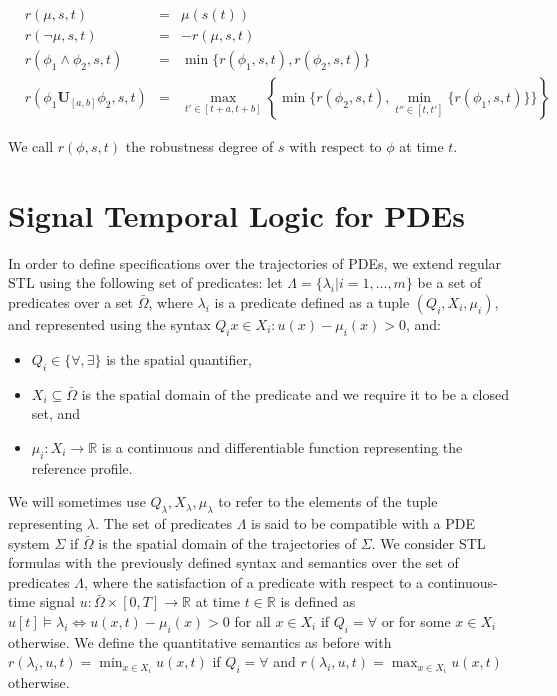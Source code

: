 \documentclass[oribibl]{llncs/llncs}
\newcommand*{\R}{\mathbb{R}}
\newcommand{\luntil}{\mathbf{U}}
\begin{document}
\begin{equation}
    \begin{aligned}
        &r(\mu, s, t) &= &\mu(s(t)) \\
        &r(\lnot \mu, s, t) &= &-r(\mu, s,t) \\
        &r(\phi_1 \land \phi_2, s, t) &= &\min\{r(\phi_1,s, t),
    r(\phi_2,s, t)\} \\
    &r(\phi_1 \luntil_{[a,b]} \phi_2,s, t) &= 
    &\max_{t' \in [t+a, t+b]} \left \{ \min\{ r(\phi_2,s, t), 
\min_{t'' \in [t, t']}\{r(\phi_1,s, t)\}\} \right \}
    \end{aligned}
\end{equation}

We call $r(\phi,s, t)$ the robustness degree of $s$ with respect to $\phi$ at
time $t$.

\section{Signal Temporal Logic for PDEs}
\label{sec:signal_temporal_logic_for_pdes}

In order to define specifications over the trajectories of PDEs, we extend
regular STL using the following set of predicates:
let $\Lambda = \{\lambda_i | i = 1,...,m\}$ be a set of predicates over
a set $\bar\Omega$, where $\lambda_i$ is a predicate defined as a tuple $(Q_i, X_i, \mu_i)$, 
and represented using the syntax $Q_i x \in X_i : u(x) - \mu_i(x) >
0$, and:

\begin{itemize}
    \item $Q_i \in \{\forall, \exists\}$ is the spatial quantifier,
    \item $X_i \subseteq \bar\Omega$ is the spatial domain of the predicate and
        we require it to be a closed set, and 
    \item $\mu_i : X_i \to \R$ is a continuous and differentiable function 
        representing the reference profile.
\end{itemize}

We will sometimes use $Q_\lambda, X_\lambda, \mu_\lambda$ to refer to the
elements of the tuple representing $\lambda$. The set of predicates $\Lambda$ is
said to be compatible with a PDE system $\Sigma$ if $\bar\Omega$ is the spatial
domain of the trajectories of $\Sigma$. We consider STL formulas 
with the previously defined syntax and semantics 
over the set of predicates $\Lambda$, where the satisfaction of a
predicate with respect to a continuous-time signal $u : \bar\Omega \times [0, T]
\to \R$ at time $t \in \R$ is defined as $u[t] \models \lambda_i \iff 
u(x, t) - \mu_i(x) > 0$ for all $x \in X_i$ if $Q_i = \forall$ or for some $x \in
X_i$ otherwise. We define the quantitative semantics as before with
$r(\lambda_i,u, t) = \min_{x \in X_i} u(x, t)$ if $Q_i = \forall$ and
$r(\lambda_i,u, t) = \max_{x \in X_i} u(x, t)$ otherwise.
\end{document}
